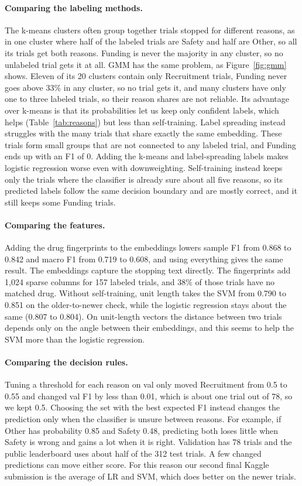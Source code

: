 \documentclass[10pt,twocolumn,letterpaper]{article}
\begin{document}
\paragraph{Comparing the labeling methods.}
The k-means clusters often group together trials stopped for different reasons, as in one cluster where half of the labeled trials are Safety and half are Other, so all its trials get both reasons.
Funding is never the majority in any cluster, so no unlabeled trial gets it at all.
GMM has the same problem, as Figure~\ref{fig:gmm} shows.
Eleven of its 20 clusters contain only Recruitment trials, Funding never goes above 33\% in any cluster, so no trial gets it, and many clusters have only one to three labeled trials, so their reason shares are not reliable.
Its advantage over k-means is that its probabilities let us keep only confident labels, which helps (Table~\ref{tab:reasons}) but less than self-training.
Label spreading instead struggles with the many trials that share exactly the same embedding.
These trials form small groups that are not connected to any labeled trial, and Funding ends up with an F1 of 0.
Adding the k-means and label-spreading labels makes logistic regression worse even with downweighting.
Self-training instead keeps only the trials where the classifier is already sure about all five reasons, so its predicted labels follow the same decision boundary and are mostly correct, and it still keeps some Funding trials.

\paragraph{Comparing the features.}
Adding the drug fingerprints to the embeddings lowers sample F1 from 0.868 to 0.842 and macro F1 from 0.719 to 0.608, and using everything gives the same result.
The embeddings capture the stopping text directly. The fingerprints add 1{,}024 sparse columns for 157 labeled trials, and 38\% of those trials have no matched drug.
Without self-training, unit length takes the SVM from 0.790 to 0.851 on the older-to-newer check, while the logistic regression stays about the same (0.807 to 0.804).
On unit-length vectors the distance between two trials depends only on the angle between their embeddings, and this seems to help the SVM more than the logistic regression.

\paragraph{Comparing the decision rules.}
Tuning a threshold for each reason on val only moved Recruitment from 0.5 to 0.55 and changed val F1 by less than 0.01, which is about one trial out of 78, so we kept 0.5.
Choosing the set with the best expected F1 instead changes the prediction only when the classifier is unsure between reasons.
For example, if Other has probability 0.85 and Safety 0.48, predicting both loses little when Safety is wrong and gains a lot when it is right.
Validation has 78 trials and the public leaderboard uses about half of the 312 test trials. A few changed predictions can move either score. For this reason our second final Kaggle submission is the average of LR and SVM, which does better on the newer trials.
\end{document}
